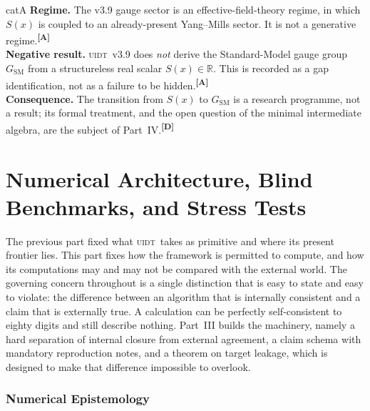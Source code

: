 \documentclass[12pt,a4paper,twoside]{article}
\theoremstyle{plain}
\theoremstyle{definition}
\theoremstyle{remark}
\newcommand{\UIDT}{\textsc{uidt}}
\newcommand{\catmark}[1]{\textsuperscript{\textsf{\textbf{[#1]}}}}
\begin{document}
\begin{evidencebox}{catA}
\textbf{Regime.} The v3.9 gauge sector is an effective-field-theory regime, in which $S(x)$ is coupled to an already-present Yang--Mills sector. It is not a
generative regime.\catmark{A}\\[0.3em]
\textbf{Negative result.} \UIDT\ v3.9 does \emph{not} derive the Standard-Model gauge group $G_{\mathrm{SM}}$ from a structureless real scalar $S(x)\in\mathbb{R}$. This is recorded as a gap identification, not as a
failure to be hidden.\catmark{A}\\[0.3em]
\textbf{Consequence.} The transition from $S(x)$ to $G_{\mathrm{SM}}$ is a research programme, not a result; its formal treatment, and the open question of the minimal intermediate algebra, are the subject of Part~IV.\catmark{D}
\end{evidencebox}
\newpage
\part{Numerical Architecture, Blind Benchmarks, and Stress Tests}
\label{part:numerical-architecture}

\noindent The previous part fixed what \UIDT\ takes as primitive and where its present frontier lies. This part fixes how the framework is permitted to compute, and how its computations may and may not be compared with the external world. The governing concern throughout is a single distinction that is easy to state and easy to violate: the difference between an algorithm that is internally consistent and a claim that is externally true. A calculation can be perfectly self-consistent to eighty digits and still describe nothing. Part~III builds the machinery, namely a hard separation of internal closure from external agreement, a claim schema with mandatory reproduction notes, and a theorem on target leakage, which is designed to make that difference impossible to overlook.

\newpage
\section{Numerical Epistemology}
\label{sec:numerical-epistemology}
\end{document}
